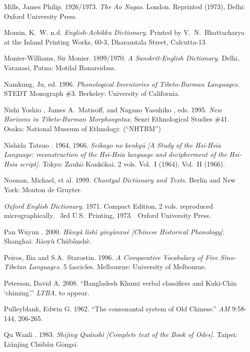 Mills, James Philip.
1926/1973.
\textit{The Ao Nagas.}
London. Reprinted (1973), Delhi: Oxford University Press.

Momin, K.~W\@.
n.d.
\textit{English-Achikku Dictionary.}
Printed by V.\ N.\ Bhattacharya at the Inland Printing Works, 60-3, Dharamtala Street, Calcutta-13.

Monier-Williams, Sir Monier.
1899/1970.
\textit{A Sanskrit-English Dictionary.}
Delhi, Varanasi, Patna: Motilal Banarsidass.

Namkung, Ju, ed.
1996.
\textit{Phonological Inventories of Tibeto-Burman Languages.}
STEDT Monograph \#3. Berkeley: University of California.

Nishi Yoshio , James A.\ Matisoff, and Nagano Yasuhiko , eds.
1995.
\textit{New Horizons in Tibeto-Burman Morphosyntax.}
Senri Ethnological Studies \#41. Osaka: National Museum of Ethnology. (“NHTBM”)

Nishida Tatsuo .
1964, 1966.
 \textit{Seikago no kenkyū [A Study of the Hsi-Hsia Language: reconstruction of the Hsi-Hsia language and decipherment of the Hsi-Hsia script].}
Tokyo:  Zauhō Kankōkai.  2 vols. Vol.~I (1964), Vol.~II (1966).

Noonan, Michael, et al.
1999.
\textit{Chantyal Dictionary and Texts.}
Berlin and New York: Mouton de Gruyter.

\textit{Oxford English Dictionary.}
1971.
Compact Edition, 2 vols. reproduced micrographically.  3rd U.S.\ Printing, 1973.  Oxford University Press.

Pan Wuyun .
2000.
 \textit{Hànyǔ lìshǐ yīnyùnxué [Chinese Historical Phonology].}
Shanghai:  Jiàoyù Chūbǎnshè.

Peiros, Ilia and S.A.~Starostin.
1996.
\textit{A Comparative Vocabulary of Five Sino-Tibetan Languages.}
5 fascicles. Melbourne: University of Melbourne.


Peterson, David A.
2008.
“Bangladesh Khumi verbal classifiers and Kuki-Chin ‘chiming’.”
\textit{LTBA}, to appear.

Pulleyblank, Edwin G.
1962.
“The consonantal system of Old Chinese.”
\textit{AM} 9:58-144, 206-265.

Qu Wanli .
1983.
 \textit{Shījīng Quánshì [Complete text of  the Book of Odes].}
Taipei:  Liánjīng Chūbǎn Gōngsī.

